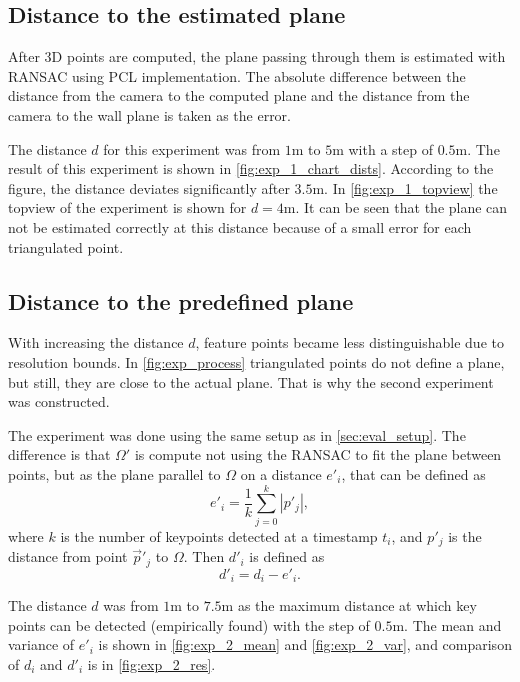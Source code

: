\subsection{Distance to the estimated plane}
\label{sec:exp1}
After 3D points are computed, the plane passing through them is estimated with RANSAC using PCL implementation. 
The absolute difference between the distance from the camera to the computed plane and the distance from the camera to the wall plane is taken as the error.

The distance $d$ for this experiment was from $1$m to $5$m with a step of $0.5$m.
The result of this experiment is shown in \autoref{fig:exp_1_chart_dists}.
According to the figure, the distance deviates significantly after $3.5$m.
In \autoref{fig:exp_1_topview} the topview of the experiment is shown for $d=4$m.
It can be seen that the plane can not be estimated correctly at this distance because of a small error for each triangulated point.

\subsection{Distance to the predefined plane}
\label{sec:exp2}
With increasing the distance $d$, feature points became less distinguishable due to resolution bounds.
In \autoref{fig:exp_process} triangulated points do not define a plane, but still, they are close to the actual plane.
That is why the second experiment was constructed.

The experiment was done using the same setup as in \autoref{sec:eval_setup}. 
The difference is that $\Omega'$ is compute not using the RANSAC to fit the plane between points, but as the plane parallel to $\Omega$ on a distance $e'_i$, that can be defined as
\begin{equation}    
    e'_i = \frac{1}{k} \sum_{j=0}^{k}{|p'_j|},
\end{equation}
where $k$ is the number of keypoints detected at a timestamp $t_i$, and $p'_j$ is the distance from point $\vec{p}'_j$ to $\Omega$.
Then $d'_i$ is defined as 
\begin{equation}
    d'_i = d_i - e'_i.
\end{equation}

The distance $d$ was from $1$m to $7.5$m as the maximum distance at which key points can be detected (empirically found) with the step of $0.5$m.
The mean and variance of $e'_i$ is shown in \autoref{fig:exp_2_mean} and \autoref{fig:exp_2_var}, and comparison of $d_i$ and $d'_i$ is in \autoref{fig:exp_2_res}. 


